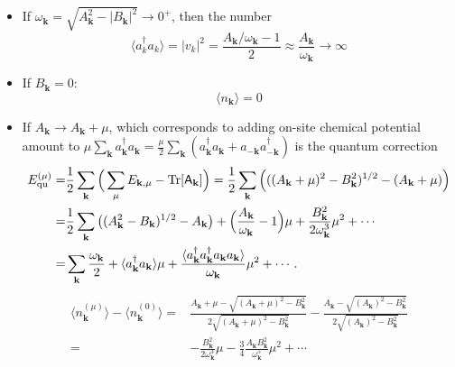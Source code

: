 \documentclass[aps, prx, nofootinbib, superscriptaddress]{revtex4-2}
\newcommand{\kvec}{\mathbf{k}}
\newcommand{\Tr}{\mathrm{Tr}}
\begin{document}
\begin{itemize}
    \item If $\omega_{\kvec} = \sqrt{A^{2}_{\kvec} - |B_{\kvec}|^{2}} \rightarrow 0^{+}$, then the number 
    \begin{equation}
        \langle a_{k}^{\dagger} a_{k} \rangle = |v_k|^2 = \frac{A_{\kvec}/\omega_{\kvec} - 1}{2} \approx \frac{A_{\kvec}}{\omega_{\kvec}} \rightarrow \infty
    \end{equation}
    \item  If $B_{\kvec} = 0$:
    \begin{equation}
        \langle n_{\kvec} \rangle = 0
    \end{equation}
    \item If $A_{\kvec} \rightarrow A_{\kvec} + \mu$, which corresponds to adding on-site chemical potential amount to $\mu \sum_{\kvec} a_{\kvec}^{\dagger}a_{\kvec} = \frac{\mu}{2} \sum_{\kvec} (a_{\kvec}^{\dagger}a_{\kvec} + a_{-\kvec}a^{\dagger}_{-\kvec} )$ is the quantum correction
    \begin{align*}
        E_{\rm qu}^{(\mu)}
        = & \frac{1}{2} \sum_{\kvec} \Big( \sum_{\mu} E_{\kvec, \mu} - \Tr[\mathsf{A}_{\kvec}]\Big)
        = \frac{1}{2}\sum_{\kvec}  \Big(  ((A_{\kvec} + \mu)^{2} - B_{\kvec}^{2})^{1/2} - (A_{\kvec} + \mu) \Big) \\
        = & \frac{1}{2} \sum_{\kvec} \big( (A_{\kvec}^{2} - B_{\kvec})^{1/2} - A_{\kvec} \big) 
        + \Big( \frac{A_{\kvec}}{\omega_{\kvec}} - 1\Big) \mu 
        + \frac{B_{\kvec}^{2}}{2\omega^{3}_{\kvec}} \mu^{2} + \cdots  \\
        = & \sum_{\kvec} \frac{\omega_{\kvec}}{2} + \langle a_{\kvec}^{\dagger} a_{\kvec} \rangle \mu +  \frac{\langle a_{\kvec}^{\dagger} a_{\kvec}^{\dagger} a_{\kvec} a_{\kvec} \rangle}{\omega_{\kvec}} \mu^{2} + \cdots.
    \end{align*}
    \begin{align*}
        \langle n_{\kvec}^{(\mu)} \rangle - \langle n_{\kvec}^{(0)} \rangle 
        = & \frac{A_{\kvec} + \mu - \sqrt{(A_{\kvec} + \mu)^{2} - B_{\kvec}^{2}}}{2 \sqrt{(A_{\kvec} + \mu)^{2} - B_{\kvec}^{2}} } 
        - \frac{A_{\kvec} - \sqrt{(A_{\kvec})^{2} - B_{\kvec}^{2}}}{2 \sqrt{(A_{\kvec})^{2} - B_{\kvec}^{2}} } \\
        = & - \frac{B_{\kvec}^{2}}{2 \omega^{3}_{\kvec}} \mu - \frac{3}{4} \frac{A_{\kvec}B_{\kvec}^{2}}{\omega_{\kvec}^{5}} \mu^{2} + \cdots
    \end{align*}
\end{itemize}



\end{document}
